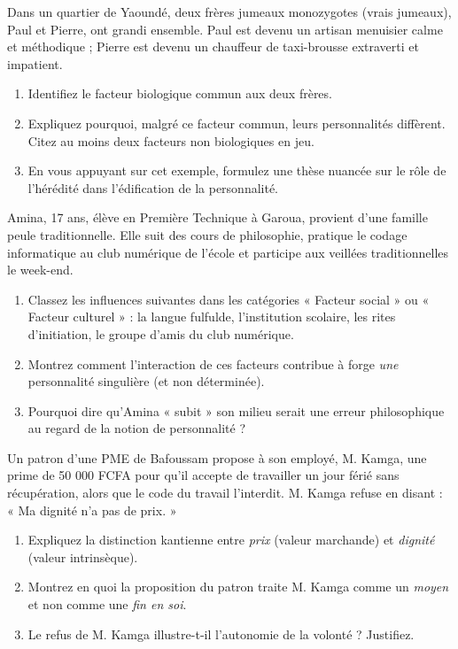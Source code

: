 \documentclass[11pt]{article}
\newcounter{popsec}
\newcounter{popsub}
\newcommand{\courssub}[1]{%
  \stepcounter{popsub}%
  \par\vspace{9pt}\noindent{\popxbold\fontsize{11.5}{13}\selectfont\color{popink}{\color{poporange}\thepopsec.\thepopsub}\hspace{6pt}#1}\par\nopagebreak\vspace{4pt}
}
\begin{document}
\courssub{Je m'entraîne}

\begin{exercice}
Dans un quartier de Yaoundé, deux frères jumeaux monozygotes (vrais jumeaux), Paul et Pierre, ont grandi ensemble. Paul est devenu un artisan menuisier calme et méthodique ; Pierre est devenu un chauffeur de taxi-brousse extraverti et impatient.
\begin{enumerate}
    \item Identifiez le facteur biologique commun aux deux frères.
    \item Expliquez pourquoi, malgré ce facteur commun, leurs personnalités diffèrent. Citez au moins deux facteurs non biologiques en jeu.
    \item En vous appuyant sur cet exemple, formulez une thèse nuancée sur le rôle de l'hérédité dans l'édification de la personnalité.
\end{enumerate}
\end{exercice}

\begin{exercice}
Amina, 17 ans, élève en Première Technique à Garoua, provient d'une famille peule traditionnelle. Elle suit des cours de philosophie, pratique le codage informatique au club numérique de l'école et participe aux veillées traditionnelles le week-end.
\begin{enumerate}
    \item Classez les influences suivantes dans les catégories « Facteur social » ou « Facteur culturel » : la langue fulfulde, l'institution scolaire, les rites d'initiation, le groupe d'amis du club numérique.
    \item Montrez comment l'interaction de ces facteurs contribue à forge \emph{une} personnalité singulière (et non déterminée).
    \item Pourquoi dire qu'Amina « subit » son milieu serait une erreur philosophique au regard de la notion de personnalité ?
\end{enumerate}
\end{exercice}

\begin{exercice}
Un patron d'une PME de Bafoussam propose à son employé, M. Kamga, une prime de 50 000 FCFA pour qu'il accepte de travailler un jour férié sans récupération, alors que le code du travail l'interdit. M. Kamga refuse en disant : « Ma dignité n'a pas de prix. »
\begin{enumerate}
    \item Expliquez la distinction kantienne entre \emph{prix} (valeur marchande) et \emph{dignité} (valeur intrinsèque).
    \item Montrez en quoi la proposition du patron traite M. Kamga comme un \emph{moyen} et non comme une \emph{fin en soi}.
    \item Le refus de M. Kamga illustre-t-il l'autonomie de la volonté ? Justifiez.
\end{enumerate}
\end{exercice}
\end{document}
